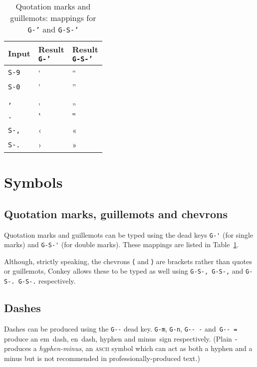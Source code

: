 \documentclass[oneside]{memoir}
\newcommand{\key}{\verb}
\newcommand{\keynv}{\texttt}
\newcommand{\out}[1]{\colorbox{gray!20}{#1}}
\begin{document}
\begin{table}[t]
\caption{Quotation marks and guillemots: mappings for \keynv{G-'} and \keynv{G-S-'}}
\label{tab:quotes_guillemots}
\centering
\begin{tabular}{lll}
\toprule
Input & \makecell{Result\\\keynv{G-'}} & \makecell{Result\\\keynv{G-S-'}} \\
\midrule
\key|S-9| & ‘ & “ \\
\key|S-0| & ’ & ” \\
\key|,|   & ‚ & „ \\
\key|.|   & ‛ & ‟ \\
\key|S-,| & ‹ & « \\
\key|S-.| & › & » \\
\bottomrule
\end{tabular}
\end{table}

\section{Symbols}
\label{sec:symbols}

\subsection{Quotation marks, guillemots and chevrons}
\label{sec:quotation_marks_guillemots_chevrons}

Quotation marks and guillemots can be typed using the dead keys
  \key|G-'| (for single marks) and \key|G-S-'| (for double marks).
These mappings are listed in Table~\ref{tab:quotes_guillemots}.

Although, strictly speaking, the chevrons \out{⟨} and \out{⟩} are brackets rather than quotes or guillemots,
  Conkey allows these to be typed as well using \key|G-S-, G-S-,| and \key|G-S-. G-S-.| respectively.

\subsection{Dashes}
\label{sec:dashes}

Dashes can be produced using the \key|G--| dead key.
\key|G-m|, \key|G-n|, \key|G-- -| and~\key|G-- =|
  produce an em~dash, en~dash, hyphen and minus~sign respectively.
(Plain \key|-| produces a \textit{hyphen-minus},
  an \textsc{ascii} symbol which can act as both a hyphen and a minus
  but is not recommended in professionally-produced text.)
\end{document}
